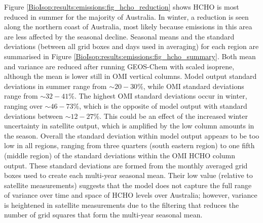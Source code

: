       
      
      
      Figure \ref{BioIsop:results:emissions:fig_hcho_reduction} shows HCHO is most reduced in summer for the majority of Australia.
      In winter, a reduction is seen along the northern coast of Australia, most likely because emissions in this area are less affected by the seasonal decline.
      Seasonal means and the standard deviations (between all grid boxes and days used in averaging) for each region are summarised in Figure \ref{BioIsop:results:emissions:fig_hcho_summary}.
      Both mean and variance are reduced after running GEOS-Chem with scaled isoprene, although the mean is lower still in OMI vertical columns.
      Model output standard deviations in summer range from $\sim{20-30}\%$, while OMI standard deviations range from $\sim{32-41}\%$.
      The highest OMI standard deviations occur in winter, ranging over $\sim{46-73}\%$, which is the opposite of model output with standard deviations between $\sim{12-27}\%$.
      This could be an effect of the increased winter uncertainty in satellite output, which is amplified by the low column amounts in the season.
      Overall the standard deviation within model output appears to be too low in all regions, ranging from three quarters (south eastern region) to one fifth (middle region) of the standard deviations within the OMI HCHO column output.
      These standard deviations are formed from the monthly averaged grid boxes used to create each multi-year seasonal mean.
      Their low value (relative to satellite measurements) suggests that the model does not capture the full range of variance over time and space of HCHO levels over Australia; however, variance is heightened in satellite measurements due to the filtering that reduces the number of grid squares that form the multi-year seasonal mean.
      
      
      
